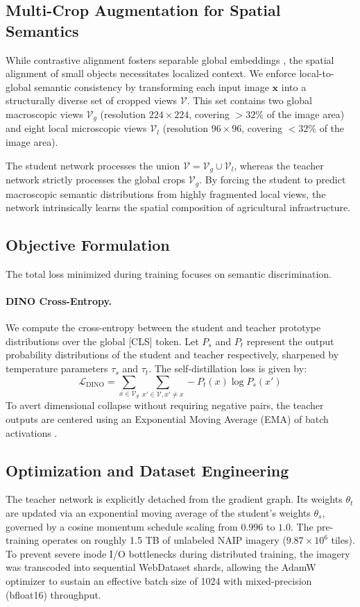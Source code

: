 \subsection{Multi-Crop Augmentation for Spatial Semantics}
While contrastive alignment fosters separable global embeddings \cite{jain2022multimodal}, the spatial alignment of small objects necessitates localized context. We enforce local-to-global semantic consistency by transforming each input image $\mathbf{x}$ into a structurally diverse set of cropped views $\mathcal{V}$. This set contains two global macroscopic views $\mathcal{V}_g$ (resolution $224 \times 224$, covering $>32\%$ of the image area) and eight local microscopic views $\mathcal{V}_l$ (resolution $96 \times 96$, covering $<32\%$ of the image area). 

The student network processes the union $\mathcal{V} = \mathcal{V}_g \cup \mathcal{V}_l$, whereas the teacher network strictly processes the global crops $\mathcal{V}_g$. By forcing the student to predict macroscopic semantic distributions from highly fragmented local views, the network intrinsically learns the spatial composition of agricultural infrastructure.

\subsection{Objective Formulation}
The total loss minimized during training focuses on semantic discrimination.

\paragraph{DINO Cross-Entropy.} We compute the cross-entropy between the student and teacher prototype distributions over the global [CLS] token. Let $P_s$ and $P_t$ represent the output probability distributions of the student and teacher respectively, sharpened by temperature parameters $\tau_s$ and $\tau_t$. The self-distillation loss is given by:
\begin{equation}
    \mathcal{L}_{\text{DINO}} = \sum_{x \in \mathcal{V}_g} \sum_{x' \in \mathcal{V}, x' \neq x} - P_t(x) \log P_s(x')
\end{equation}
To avert dimensional collapse without requiring negative pairs, the teacher outputs are centered using an Exponential Moving Average (EMA) of batch activations \cite{caron2021emerging}.

\subsection{Optimization and Dataset Engineering}
The teacher network is explicitly detached from the gradient graph. Its weights $\theta_t$ are updated via an exponential moving average of the student's weights $\theta_s$, governed by a cosine momentum schedule scaling from $0.996$ to $1.0$. The pre-training operates on roughly 1.5 TB of unlabeled NAIP imagery ($9.87 \times 10^6$ tiles). To prevent severe inode I/O bottlenecks during distributed training, the imagery was transcoded into sequential WebDataset shards, allowing the AdamW optimizer to sustain an effective batch size of 1024 with mixed-precision (bfloat16) throughput.
